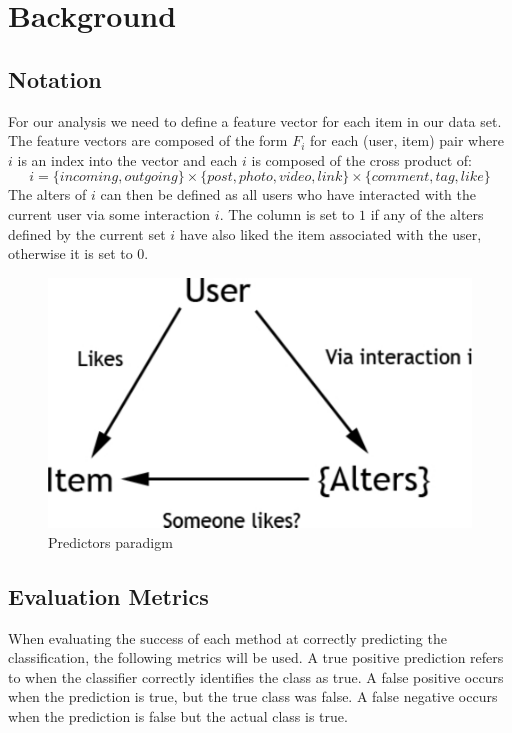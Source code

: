 
\chapter{Background}
\label{cha:back}

\section{Notation}
\label{sec:notation}


For our analysis we need to define a feature vector for each item in our data set. The feature vectors are composed of the form 
\( F_i \) for each (user, item) pair where \( i \) is an index into the vector and each \( i \) is composed of the cross product of:
\[ i = \{incoming, outgoing\} \times \{post,photo,video,link\} \times \{comment,tag,like\} \]
The alters of \( i \) can then be defined as all users who have interacted with the current user via some interaction \( i \). The column is 
set to \( 1 \) if any of the alters defined by the current set \( i \) have also liked the item associated with the user, otherwise it is set to \( 0 \).

\begin{figure}[h]
	\begin{center}
		\includegraphics[scale=0.60]{imgs/alters.pdf}
		\caption{Predictors paradigm}
	\end{center}
\end{figure}

\section{Evaluation Metrics}
\label{sec:notation}

When evaluating the success of each method at correctly predicting the classification, the following metrics will be used.
A true positive prediction refers to when the classifier correctly identifies the class as true. A false positive occurs when the prediction 
is true, but the true class was false. A false negative occurs when the prediction is false but the actual class is true.


